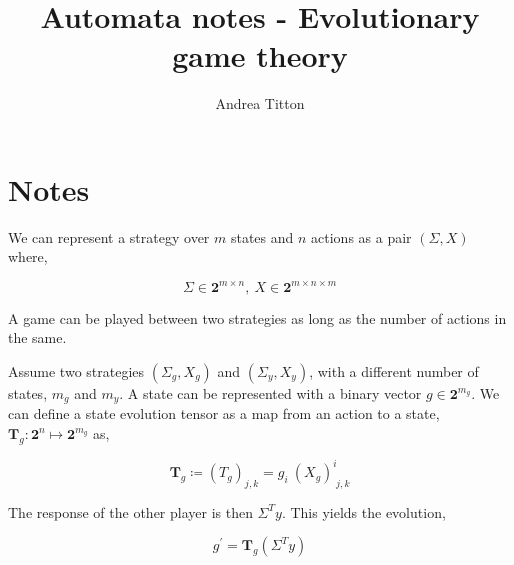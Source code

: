\documentclass[american]{scrartcl}
\title{Automata notes - Evolutionary game theory}
\author{Andrea Titton}
\newcommand{\Two}{\mathbf{2}}
\begin{document}

\maketitle

\section{Notes}

We can represent a strategy over $m$ states and $n$ actions as a pair $(\Sigma, X)$ where,

\begin{equation}
    \Sigma \in \Two^{m \times n}, \ X \in \Two^{m \times n \times m}
\end{equation}

A game can be played between two strategies as long as the number of actions in the same.

Assume two strategies $(\Sigma_g, X_g)$ and $(\Sigma_y, X_y)$, with a different number of states, $m_g$ and $m_y$. A state can be represented with a binary vector $g \in \Two^{m_g}$. We can define a state evolution tensor as a map from an action to a state, $\mathbf{T}_g : \Two^n \mapsto \Two^{m_g}$ as,

\begin{equation}
    \mathbf{T}_g \coloneqq (T_g)_{j, k} = g_i \ (X_g)^i_{\; j, k}
\end{equation}

The response of the other player is then $\Sigma^T y$. This yields the evolution,

\begin{equation}
    g^\prime = \mathbf{T}_g (\Sigma^T y)
\end{equation}
\end{document}
